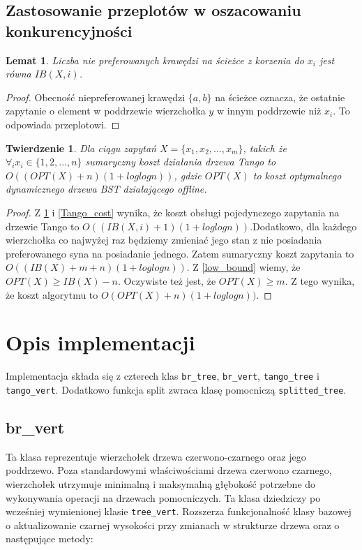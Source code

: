 \documentclass[declaration,shortabstract]{iithesis}
\newcounter{thm}[section]
\theoremstyle{thm}
\theoremstyle{remark}
\theoremstyle{plain}
\newtheorem{theorem}[thm]{Twierdzenie}
\theoremstyle{plain}
\theoremstyle{plain}
\newtheorem{lemma}[thm]{Lemat}
\begin{document}
\subsection{Zastosowanie przeplotów w oszacowaniu konkurencyjności} 
\begin{lemma}
\label{num_switch} 
Liczba nie preferowanych krawędzi na ścieżce z korzenia do \(x_i\) jest równa \(IB(X, i)\). 
\end{lemma} 
\begin{proof} 
Obecność niepreferowanej krawędzi \( \{a, b\}\) na ścieżce oznacza, że ostatnie zapytanie o element w poddrzewie wierzchołka $y$ w innym poddrzewie niż \(x_i\). To odpowiada przeplotowi. 
\end{proof}  

\begin{theorem} 
Dla ciągu zapytań \(X = \{x_1, x_2,..., x_m\}\), takich że \( \forall_i x_i \in \{1, 2, ..., n\}\) sumaryczny koszt działania drzewa Tango to \( O((OPT(X) + n)(1 + loglogn))\), gdzie \(OPT(X)\) to koszt optymalnego dynamicznego drzewa BST działającego offline. 
\end{theorem} 
\begin{proof} 
Z \ref{num_switch} i \ref{Tango_cost} wynika, że koszt obsługi pojedynczego zapytania na drzewie Tango to \(O((IB(X, i)+1)(1+loglogn))\).Dodatkowo, dla każdego wierzchołka co najwyżej raz będziemy zmieniać jego stan z nie posiadania preferowanego syna na posiadanie jednego. Zatem sumaryczny koszt zapytania to \(O((IB(X)+m +n )(1+loglogn))\). Z \ref{low_bound} wiemy, że \(OPT(X) \geq IB(X) - n\). Oczywiste też jest, że \(OPT(X) \geq m\). Z tego wynika, że koszt algorytmu to \(O(OPT(X)+n )(1+loglogn))\). 
\end{proof}  

\section{Opis implementacji} 

Implementacja składa się z czterech klas \texttt{br\_tree}, \texttt{br\_vert}, \texttt{tango\_tree} i \texttt{tango\_vert}. Dodatkowo funkcja split zwraca klasę pomocniczą  \texttt{splitted\_tree}.


\subsection{br\_vert}

Ta klasa reprezentuje wierzchołek drzewa czerwono-czarnego oraz jego poddrzewo. Poza standardowymi właściwościami drzewa czerwono czarnego, wierzchołek utrzymuje minimalną i maksymalną głębokość potrzebne do wykonywania operacji na drzewach pomocniczych. Ta klasa dziedziczy po wcześniej wymienionej klasie \texttt{tree\_vert}. Rozszerza funkcjonalność klasy bazowej o aktualizowanie czarnej wysokości przy zmianach w strukturze drzewa oraz o następujące metody:
\end{document}
